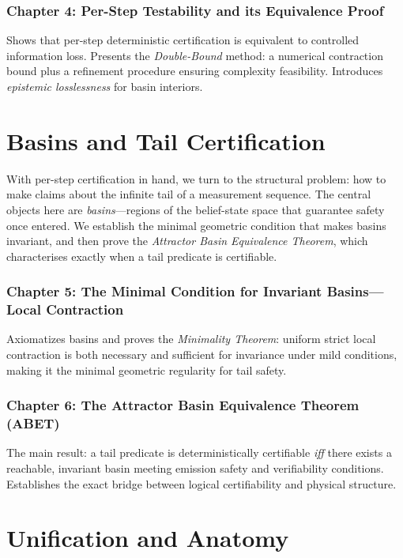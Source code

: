 \documentclass[12pt]{article}
\begin{document}
\section*{Chapter 4: Per-Step Testability and its Equivalence Proof}
Shows that per-step deterministic certification is equivalent to controlled information loss. Presents the \emph{Double-Bound} method: a numerical contraction bound plus a refinement procedure ensuring complexity feasibility. Introduces \emph{epistemic losslessness} for basin interiors.

\part[Basins and Tail Certification]{Basins and Tail Certification}

\noindent
With per-step certification in hand, we turn to the structural problem: how to make claims about the infinite tail of a measurement sequence. The central objects here are \emph{basins}—regions of the belief-state space that guarantee safety once entered. We establish the minimal geometric condition that makes basins invariant, and then prove the \emph{Attractor Basin Equivalence Theorem}, which characterises exactly when a tail predicate is certifiable.

\section*{Chapter 5: The Minimal Condition for Invariant Basins---Local Contraction}
Axiomatizes basins and proves the \emph{Minimality Theorem}: uniform strict local contraction is both necessary and sufficient for invariance under mild conditions, making it the minimal geometric regularity for tail safety.

\section*{Chapter 6: The Attractor Basin Equivalence Theorem (ABET)}
The main result: a tail predicate is deterministically certifiable \emph{iff} there exists a reachable, invariant basin meeting emission safety and verifiability conditions. Establishes the exact bridge between logical certifiability and physical structure.

\part[Unification and Anatomy]{Unification and Anatomy}
\end{document}
